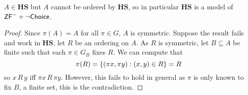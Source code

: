 \begin{theorem}
    \(A\in\mathbf{HS}\) but \(A\) cannot be ordered by \(\mathbf{HS}\), so in particular
    \(\mathbf{HS}\) is a model of \(\mbox{\normalfont \textsf{ZF}}^- + \lnot{\normalfont\textsf{Choice}}\).
\end{theorem}
\begin{proof}
    Since \(\pi(A) = A\) for all \(\pi\in G\), \(A\) is symmetric.
    Suppose the result fails and work in \(\mathbf{HS}\), let \(R\) be an ordering on \(A\).
    As \(R\) is symmetric, let \(B\subseteq A\) be finite such that each \(\pi\in G_B\) fixes \(R\).
    We can compute that
    \[ \pi(R) = \left\{ \left(\pi x,\pi y\right): \left(x,y\right)\in R \right\} = R \]
    so \(x\,R\,y\) iff \(\pi x\,R\,\pi y\).
    However, this fails to hold in general as \(\pi\) is only known to fix \(B\), a finite set, this is the contradiction.
\end{proof}

